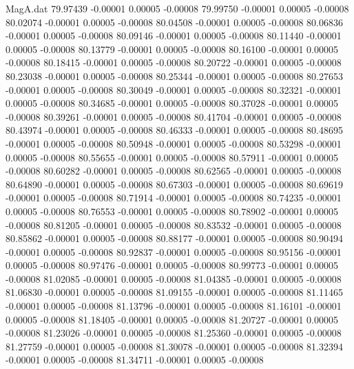 \begin{filecontents}{MagA.dat}
  79.97439   -0.00001    0.00005   -0.00008
  79.99750   -0.00001    0.00005   -0.00008
  80.02074   -0.00001    0.00005   -0.00008
  80.04508   -0.00001    0.00005   -0.00008
  80.06836   -0.00001    0.00005   -0.00008
  80.09146   -0.00001    0.00005   -0.00008
  80.11440   -0.00001    0.00005   -0.00008
  80.13779   -0.00001    0.00005   -0.00008
  80.16100   -0.00001    0.00005   -0.00008
  80.18415   -0.00001    0.00005   -0.00008
  80.20722   -0.00001    0.00005   -0.00008
  80.23038   -0.00001    0.00005   -0.00008
  80.25344   -0.00001    0.00005   -0.00008
  80.27653   -0.00001    0.00005   -0.00008
  80.30049   -0.00001    0.00005   -0.00008
  80.32321   -0.00001    0.00005   -0.00008
  80.34685   -0.00001    0.00005   -0.00008
  80.37028   -0.00001    0.00005   -0.00008
  80.39261   -0.00001    0.00005   -0.00008
  80.41704   -0.00001    0.00005   -0.00008
  80.43974   -0.00001    0.00005   -0.00008
  80.46333   -0.00001    0.00005   -0.00008
  80.48695   -0.00001    0.00005   -0.00008
  80.50948   -0.00001    0.00005   -0.00008
  80.53298   -0.00001    0.00005   -0.00008
  80.55655   -0.00001    0.00005   -0.00008
  80.57911   -0.00001    0.00005   -0.00008
  80.60282   -0.00001    0.00005   -0.00008
  80.62565   -0.00001    0.00005   -0.00008
  80.64890   -0.00001    0.00005   -0.00008
  80.67303   -0.00001    0.00005   -0.00008
  80.69619   -0.00001    0.00005   -0.00008
  80.71914   -0.00001    0.00005   -0.00008
  80.74235   -0.00001    0.00005   -0.00008
  80.76553   -0.00001    0.00005   -0.00008
  80.78902   -0.00001    0.00005   -0.00008
  80.81205   -0.00001    0.00005   -0.00008
  80.83532   -0.00001    0.00005   -0.00008
  80.85862   -0.00001    0.00005   -0.00008
  80.88177   -0.00001    0.00005   -0.00008
  80.90494   -0.00001    0.00005   -0.00008
  80.92837   -0.00001    0.00005   -0.00008
  80.95156   -0.00001    0.00005   -0.00008
  80.97476   -0.00001    0.00005   -0.00008
  80.99773   -0.00001    0.00005   -0.00008
  81.02085   -0.00001    0.00005   -0.00008
  81.04385   -0.00001    0.00005   -0.00008
  81.06830   -0.00001    0.00005   -0.00008
  81.09155   -0.00001    0.00005   -0.00008
  81.11465   -0.00001    0.00005   -0.00008
  81.13796   -0.00001    0.00005   -0.00008
  81.16101   -0.00001    0.00005   -0.00008
  81.18405   -0.00001    0.00005   -0.00008
  81.20727   -0.00001    0.00005   -0.00008
  81.23026   -0.00001    0.00005   -0.00008
  81.25360   -0.00001    0.00005   -0.00008
  81.27759   -0.00001    0.00005   -0.00008
  81.30078   -0.00001    0.00005   -0.00008
  81.32394   -0.00001    0.00005   -0.00008
  81.34711   -0.00001    0.00005   -0.00008

\end{filecontents}
